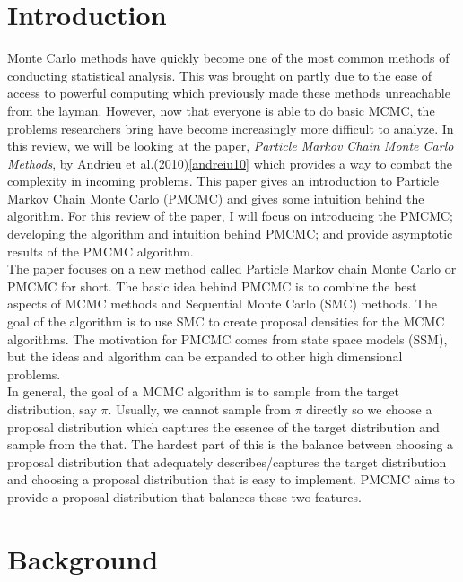 \documentclass{article}\usepackage[]{graphicx}\usepackage[]{color}
\theoremstyle{definition}
\begin{document}
\section{Introduction}
Monte Carlo methods have quickly become one of the most common methods of conducting statistical analysis. This was brought on partly due to the ease of access to powerful computing which previously made these methods unreachable from the layman. However, now that everyone is able to do basic MCMC, the problems researchers bring have become increasingly more difficult to analyze. In this review, we will be looking at the paper, \textit{Particle Markov Chain Monte Carlo Methods}, by Andrieu et al.(2010)\ref{andreiu10} which provides a way to combat the complexity in incoming problems. This paper gives an introduction to Particle Markov Chain Monte Carlo (PMCMC) and gives some intuition behind the algorithm. For this review of the paper, I will focus on introducing the PMCMC; developing the algorithm and intuition behind PMCMC; and provide asymptotic results of the PMCMC algorithm. \\

The paper focuses on a new method called Particle Markov chain Monte Carlo or PMCMC for short. The basic idea behind PMCMC is to combine the best aspects of MCMC methods and Sequential Monte Carlo (SMC) methods. The goal of the algorithm is to use SMC to create proposal densities for the MCMC algorithms. The motivation for PMCMC comes from state space models (SSM), but the ideas and algorithm can be expanded to other high dimensional problems. \\

In general, the goal of a MCMC algorithm is to sample from the target distribution, say $\pi$. Usually, we cannot sample from $\pi$ directly so we choose a proposal distribution which captures the essence of the target distribution and sample from the that. The hardest part of this is the balance between choosing a proposal distribution that adequately describes/captures the target distribution and choosing a proposal distribution that is easy to implement. PMCMC aims to provide a proposal distribution that balances these two features. \\


\section{Background}
\end{document}
